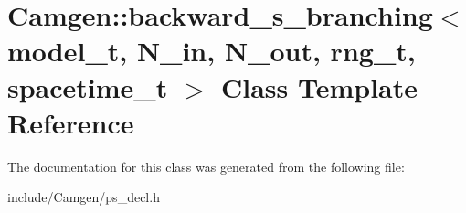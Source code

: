 \hypertarget{a00019}{\section{Camgen\-:\-:backward\-\_\-s\-\_\-branching$<$ model\-\_\-t, N\-\_\-in, N\-\_\-out, rng\-\_\-t, spacetime\-\_\-t $>$ Class Template Reference}
\label{a00019}
}


The documentation for this class was generated from the following file\-:\begin{DoxyCompactItemize}
\item 
include/\-Camgen/ps\-\_\-decl.\-h\end{DoxyCompactItemize}
